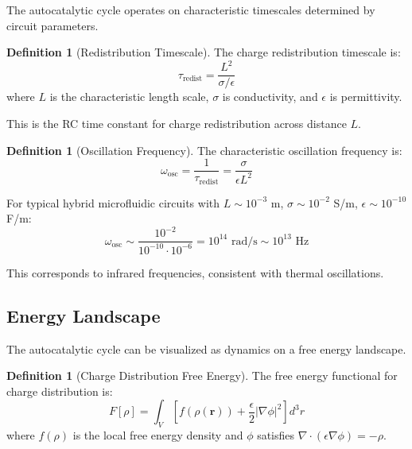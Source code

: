 \documentclass[12pt,a4paper]{article}
\theoremstyle{plain}
\theoremstyle{definition}
\newtheorem{definition}[theorem]{Definition}
\theoremstyle{remark}
\begin{document}
The autocatalytic cycle operates on characteristic timescales determined by circuit parameters.

\begin{definition}[Redistribution Timescale]
\label{def:redistribution_time}
The charge redistribution timescale is:
\begin{equation}
\tau_{\text{redist}} = \frac{L^2}{\sigma / \epsilon}
\end{equation}
where $L$ is the characteristic length scale, $\sigma$ is conductivity, and $\epsilon$ is permittivity.
\end{definition}

This is the RC time constant for charge redistribution across distance $L$.

\begin{definition}[Oscillation Frequency]
\label{def:oscillation_freq}
The characteristic oscillation frequency is:
\begin{equation}
\omega_{\text{osc}} = \frac{1}{\tau_{\text{redist}}} = \frac{\sigma}{\epsilon L^2}
\end{equation}
\end{definition}

For typical hybrid microfluidic circuits with $L \sim 10^{-3}$ m, $\sigma \sim 10^{-2}$ S/m, $\epsilon \sim 10^{-10}$ F/m:
\begin{equation}
\omega_{\text{osc}} \sim \frac{10^{-2}}{10^{-10} \cdot 10^{-6}} = 10^{14} \text{ rad/s} \sim 10^{13} \text{ Hz}
\end{equation}

This corresponds to infrared frequencies, consistent with thermal oscillations.

\subsection{Energy Landscape}

The autocatalytic cycle can be visualized as dynamics on a free energy landscape.

\begin{definition}[Charge Distribution Free Energy]
\label{def:free_energy}
The free energy functional for charge distribution is:
\begin{equation}
F[\rho] = \int_V \left[ f(\rho(\mathbf{r})) + \frac{\epsilon}{2} |\nabla \phi|^2 \right] d^3r
\end{equation}
where $f(\rho)$ is the local free energy density and $\phi$ satisfies $\nabla \cdot (\epsilon \nabla \phi) = -\rho$.
\end{definition}
\end{document}
